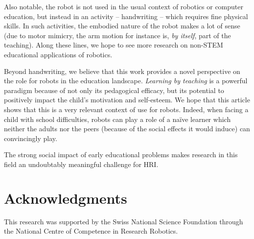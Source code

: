 \documentclass{sig-alternate}
\begin{document}
Also notable, the robot is not used in the usual context of robotics or computer
education, but instead in an activity -- handwriting -- which requires fine
physical skills. In such activities, the embodied nature of the robot makes a
lot of sense (due to motor mimicry, the arm motion for instance is, \emph{by
itself}, part of the teaching). Along these lines, we hope to see more research
on non-STEM educational applications of robotics.

Beyond handwriting, we believe that this work provides a novel perspective on
the role for robots in the education landscape. \emph{Learning by teaching} is a
powerful paradigm because of not only its pedagogical efficacy, but its
potential to positively impact the child's motivation and self-esteem. We hope that 
this article shows that this is a very relevant context of use for robots. Indeed,
when facing a child with school difficulties, robots can play a role of a na\"ive 
learner which neither the adults nor the peers (because of the social effects it would 
induce) can convincingly play.

The strong social impact of early educational problems makes research in this field
an undoubtably meaningful challenge for HRI.

\section*{Acknowledgments}

This research was supported by the Swiss National Science Foundation through the
National Centre of Competence in Research Robotics.





\end{document}
